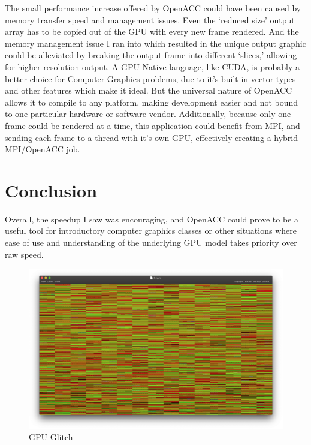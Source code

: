 \documentclass{article}
\begin{document}
The small performance increase offered by OpenACC could have been caused by memory transfer speed and management issues. Even the ‘reduced size’ output array has to be copied out of the GPU with every new frame rendered. And the memory management issue I ran into which resulted in the unique output graphic could be alleviated by breaking the output frame into different ‘slices,’ allowing for higher-resolution output. 
A GPU Native language, like CUDA, is probably a better choice for Computer Graphics problems, due to it’s built-in vector types and other features which make it ideal. But the universal nature of OpenACC allows it to compile to any platform, making development easier and not bound to one particular hardware or software vendor. 
	Additionally, because only one frame could be rendered at a time, this application could benefit from MPI, and sending each frame to a thread with it’s own GPU, effectively creating a hybrid MPI/OpenACC job. 

\section{Conclusion}

Overall, the speedup I saw was encouraging, and OpenACC could prove to be a useful tool for introductory computer graphics classes or other situations where ease of use and understanding of the underlying GPU model takes priority over raw speed. 

\begin{figure}
    \centering
    \includegraphics[width=.9\columnwidth]{quinn_fig1.png}
    \caption{GPU Glitch}
    \label{fig:my_label}
\end{figure}
\end{document}
